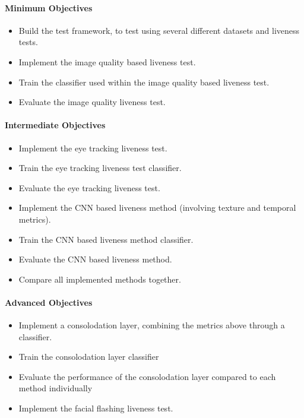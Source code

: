 \documentclass{article}
\begin{document}
    \paragraph{Minimum Objectives}
        \begin{itemize}
            \item Build the test framework, to test using several different datasets and liveness tests.
            \item Implement the image quality based liveness test.
            \item Train the classifier used within the image quality based liveness test.
            \item Evaluate the image quality liveness test.
        \end{itemize}
    \paragraph{Intermediate Objectives}
        \begin{itemize}
            \item Implement the eye tracking liveness test.
            \item Train the eye tracking liveness test classifier.
            \item Evaluate the eye tracking liveness test.
            \item Implement the CNN based liveness method (involving texture and temporal metrics).
            \item Train the CNN based liveness method classifier.
            \item Evaluate the CNN based liveness method.
            \item Compare all implemented methods together.
        \end{itemize}
    \paragraph{Advanced Objectives}
        \begin{itemize}
            \item Implement a consolodation layer, combining the metrics above through a classifier.
            \item Train the consolodation layer classifier
            \item Evaluate the performance of the consolodation layer compared to each method individually
            \item Implement the facial flashing liveness test.
        \end{itemize}
\end{document}
